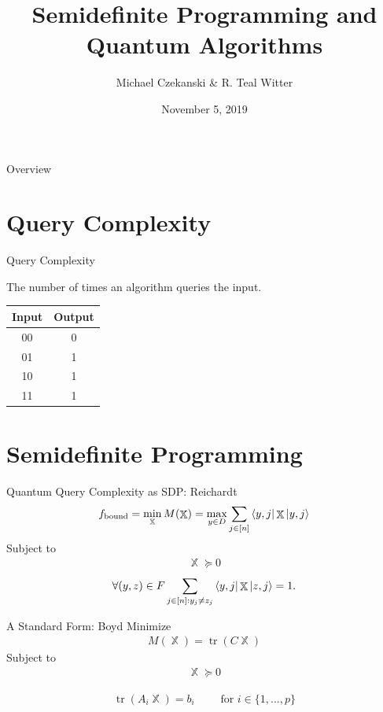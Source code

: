 \documentclass[12pt]{beamer}
\title{Semidefinite Programming and Quantum Algorithms}
\author{Michael Czekanski \& R. Teal Witter}
\institute{Middlebury College}
\date{November 5, 2019}
\DeclareMathOperator{\X}{\mathbb{X}}		     %
\DeclareMathOperator{\tr}{\text{tr}}		     %
\begin{document}
\graphicspath{{./../figures/}}

\frame{\titlepage}

\begin{frame}{Overview}
\tableofcontents
\end{frame}

\section{Query Complexity}
\begin{frame}{Query Complexity}
\begin{center}
The number of times an algorithm queries the input.
\end{center}
\begin{table}[]
\begin{tabular}{cc}
\hline
\textbf{Input} & \textbf{Output} \\ \hline
00             & 0               \\
01             & 1               \\
10             & 1               \\
11             & 1               \\ \hline
\end{tabular}
\end{table}
\end{frame}

\section{Semidefinite Programming}

\begin{frame}{Quantum Query Complexity as SDP: Reichardt \cite{reichardt2009span}}
\begin{align} \label{eq:reichardtObj} 
    f_{\text{bound}} = \min_{\X} M(\X) = \max_{y \in D} \sum_{j \in [n]}
    \bra{y,j}\X\ket{y,j} 
\end{align}
Subject to
\begin{align}\label{Eq:reichardtSemi}
    \X \succcurlyeq 0 
\end{align}
\begin{align}\label{Eq:reichardtOffDiag}
    \forall (y,z) \in F \sum_{j \in [n]: y_j \ne z_j} 
    \bra{y,j} \X \ket{z, j} = 1.
\end{align}
\end{frame}

\begin{frame}{A Standard Form: Boyd\cite{boyd2004convex}}
Minimize
\begin{align}\label{Eq:boyd_obj}
    M(\X) = \tr(C\X) 
\end{align}
Subject to
\begin{align} \label{Eq:boydSemi}
    \X \succcurlyeq 0   
\end{align}

\begin{align} \label{Eq:boydTraceCon}
    \tr(A_i \X) = b_i  \text{$\qquad$ for $i \in \{1,...,p\}$}
\end{align}
\end{frame}
\end{document}

